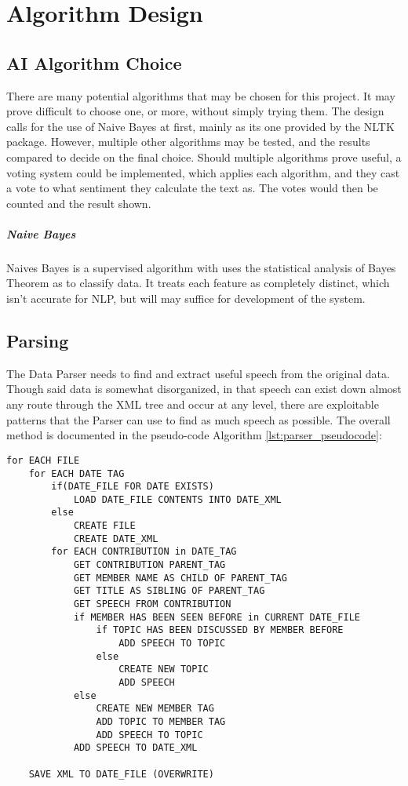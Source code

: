 \section{Algorithm Design}
\label{sec:des_algorithm}

\subsection{AI Algorithm Choice}
\label{sec:des_AI_algorithm}
There are many potential algorithms that may be chosen for this project. It may prove difficult to choose one, or more, without simply trying them. The design calls for the use of Naive Bayes at first, mainly as its one provided by the NLTK package. However, multiple other algorithms may be tested, and the results compared to decide on the final choice. Should multiple algorithms prove useful, a voting system could be implemented, which applies each algorithm, and they cast a vote to what sentiment they calculate the text as. The votes would then be counted and the result shown.

\subparagraph{Naive Bayes} %
Naives Bayes is a supervised algorithm with uses the statistical analysis of Bayes Theorem as to classify data. It treats each feature as completely distinct, which isn't accurate for NLP, but will may suffice for development of the system.

\subsection{Parsing}
\label{sec:des_Parsing_algorithm}
The Data Parser needs to find and extract useful speech from the original data. Though said data is somewhat disorganized, in that speech can exist down almost any route through the XML tree and occur at any level, there are exploitable patterns that the Parser can use to find as much speech as possible. The overall method is documented in the pseudo-code Algorithm \ref{lst:parser_pseudocode}:
\begin{lstlisting}[float=ht, caption={Data Parser Pseudo-code}, label={lst:parser_pseudocode}]
for EACH FILE
    for EACH DATE TAG
    	if(DATE_FILE FOR DATE EXISTS)
        	LOAD DATE_FILE CONTENTS INTO DATE_XML
    	else
        	CREATE FILE
        	CREATE DATE_XML
    	for EACH CONTRIBUTION in DATE_TAG
        	GET CONTRIBUTION PARENT_TAG
        	GET MEMBER NAME AS CHILD OF PARENT_TAG
        	GET TITLE AS SIBLING OF PARENT_TAG
        	GET SPEECH FROM CONTRIBUTION
        	if MEMBER HAS BEEN SEEN BEFORE in CURRENT DATE_FILE
        	    if TOPIC HAS BEEN DISCUSSED BY MEMBER BEFORE
        			ADD SPEECH TO TOPIC
        		else
        			CREATE NEW TOPIC
        			ADD SPEECH
        	else
        		CREATE NEW MEMBER TAG
        		ADD TOPIC TO MEMBER TAG
        		ADD SPEECH TO TOPIC
        	ADD SPEECH TO DATE_XML

    SAVE XML TO DATE_FILE (OVERWRITE)
\end{lstlisting}

